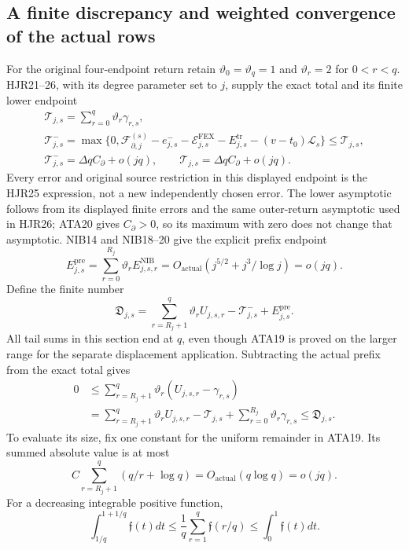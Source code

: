 \subsection{A finite discrepancy and weighted convergence of the actual rows}
For the original four-endpoint return retain
$\vartheta_0=\vartheta_q=1$ and $\vartheta_r=2$ for $0<r<q$.
HJR21--26, with its degree parameter set to $j$, supply the exact
total and its finite lower endpoint
\[
\begin{gathered}
 \mathcal T_{j,s}=\sum_{r=0}^q\vartheta_r\gamma_{r,s},\\
 \mathcal T^-_{j,s}
 =\max\{0,\mathcal F_{\partial,j}^{(s)}-e^-_{j,s}
       -\mathcal E^{\mathrm{FEX}}_{j,s}-E^{\mathrm{tr}}_{j,s}
       -(v-t_0)\mathcal L_s\}\le\mathcal T_{j,s},\\
 \mathcal T^-_{j,s}=\Delta qC_\partial+o(jq),\qquad
 \mathcal T_{j,s}=\Delta qC_\partial+o(jq).
\end{gathered}\tag{ATA21}
\]
Every error and original source restriction in this displayed endpoint
is the HJR25 expression, not a new independently chosen error.
The lower asymptotic follows from its displayed finite errors and the
same outer-return asymptotic used in HJR26; ATA20 gives $C_\partial>0$,
so its maximum with zero does not change that asymptotic.
NIB14 and NIB18--20 give the explicit prefix endpoint
\[
 E^{\mathrm{pre}}_{j,s}
 =\sum_{r=0}^{R_j}\vartheta_rE^{\mathrm{NIB}}_{j,s,r}
 =O_{\mathrm{actual}}(j^{5/2}+j^3/\log j)=o(jq).         \tag{ATA22}
\]
Define the finite number
\[
 \mathfrak D_{j,s}
 =\sum_{r=R_j+1}^q\vartheta_rU_{j,s,r}
                       -\mathcal T^-_{j,s}+E^{\mathrm{pre}}_{j,s}.
                                                               \tag{ATA23}
\]
All tail sums in this section end at $q$, even though ATA19 is proved
on the larger range for the separate displacement application.
Subtracting the actual prefix from the exact total gives
\[
\begin{split}
 0&\le\sum_{r=R_j+1}^q\vartheta_r(U_{j,s,r}-\gamma_{r,s})\\
  &=\sum_{r=R_j+1}^q\vartheta_rU_{j,s,r}
    -\mathcal T_{j,s}
    +\sum_{r=0}^{R_j}\vartheta_r\gamma_{r,s}
 \le\mathfrak D_{j,s}.
\end{split}\tag{ATA24}
\]
To evaluate its size, fix one constant for the uniform remainder
in ATA19.  Its summed absolute value is at most
\[
 C\sum_{r=R_j+1}^q(q/r+\log q)=O_{\mathrm{actual}}(q\log q)=o(jq).
\]
For a decreasing integrable positive function,
\[
 \int_{1/q}^{1+1/q}\mathfrak f(t)dt
 \le\frac1q\sum_{r=1}^q\mathfrak f(r/q)
 \le\int_0^1\mathfrak f(t)dt.
\]
